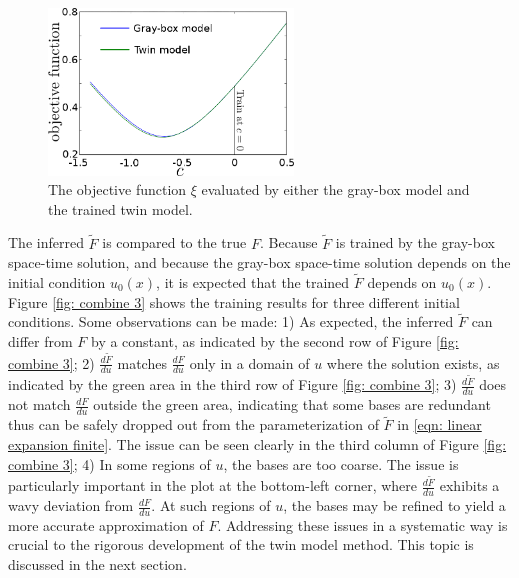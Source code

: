 \begin{figure}[htbp]\begin{center}
    \includegraphics[width=6.5cm]{../J_twin_vs_primal.png}
    \caption{The objective function $\xi$ evaluated by either the gray-box model
             and the trained twin model.}
    \label{fig: objective ad hoc}
\end{center}\end{figure}

The inferred $\tilde{F}$ is compared to the true $F$. Because $\tilde{F}$ is trained by
the gray-box space-time solution, and because the gray-box space-time solution depends on
the initial condition $u_0(x)$, it is expected
that the trained $\tilde{F}$ depends on $u_0(x)$. 
Figure \ref{fig: combine 3} shows the training results for three different initial conditions.
Some observations can be made: 1) As expected, the inferred 
$\tilde{F}$ can differ from $F$ by a constant, as 
indicated by the second row of Figure \ref{fig: combine 3}; 
2) $\frac{d\tilde{F}}{du}$ matches $\frac{dF}{du}$ only in a
domain of $u$ where the solution exists, as indicated by the green area in the third row of
Figure \ref{fig: combine 3};
3) $\frac{d\tilde{F}}{du}$ does not match $\frac{dF}{du}$ outside the green area, indicating that
some bases are redundant thus can be safely dropped out from the parameterization of $\tilde{F}$
in \eqref{eqn: linear expansion finite}.
The issue can be seen clearly in the third column of Figure \ref{fig: combine 3};
4) In some regions of $u$, the bases are too coarse. The issue is particularly important 
in the plot at the bottom-left corner, where $\frac{d\tilde{F}}{du}$ exhibits
a wavy deviation from $\frac{dF}{du}$. At such regions of $u$, the bases may be refined to
yield a more accurate approximation of $F$.
Addressing these issues in a systematic way is crucial to the rigorous development of
the twin model method. This topic is discussed in the next section.\\

